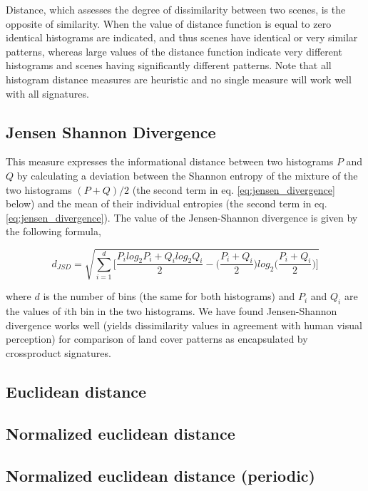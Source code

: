 Distance, which assesses the degree of dissimilarity between two scenes, is the opposite of similarity. 
When the value of distance function is equal to zero identical histograms are indicated, and thus scenes have identical or very similar patterns, whereas large values of the distance function indicate very different histograms and scenes having significantly different patterns. 
Note that all histogram distance measures are heuristic and no single measure will work well with all signatures.

\subsection{Jensen Shannon Divergence}

This measure
expresses the informational distance between two histograms $P$ and $Q$ by calculating a deviation between the Shannon entropy of the mixture of the two histograms $(P+Q)/2$ (the second term in eq. \ref{eq:jensen_divergence} below) and the mean of their individual entropies (the second term in eq. \ref{eq:jensen_divergence}).
The value of the Jensen-Shannon divergence is given by the following formula,

\begingroup
\scriptsize
\begin{equation} \label{eq:jensen_divergence}
d_{JSD}=\sqrt{\sum\limits_{i=1}^{d}{ 
\biggl[\dfrac{P_{i} log_{2} P_{i}+Q_{i} log_{2} Q_{i}}{2}
-\biggl(\dfrac{P_{i}+Q_{i}}{2} \biggr)log_{2} \biggl(\dfrac{P_{i}+Q_{i}}{2} \biggr)\biggr]}}
\end{equation}
\endgroup

\noindent where $d$ is the number of bins (the same for both histograms) and $P_i$ and $Q_i$ are the values of $i$th bin in the two histograms. 
We have found Jensen-Shannon divergence works well (yields dissimilarity values in agreement with human visual perception) for comparison of land cover patterns as encapsulated by crossproduct signatures. %

\subsection{Euclidean distance}

\subsection{Normalized euclidean distance}

\subsection{Normalized euclidean distance (periodic)}

